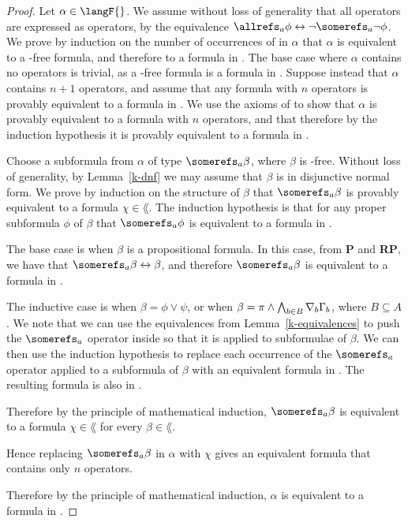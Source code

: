 \begin{proof}
Let $\alpha \in \langF{}$. We assume without loss of generality that all
\allrefs{} operators are expressed as \somerefs{} operators, by the equivalence
$\allrefs_a \phi \iff \neg \somerefs_a \neg \phi$. We prove by induction on the
number of occurrences of \somerefs{} in $\alpha$ that $\alpha$ is equivalent to
a \somerefs{}-free formula, and therefore to a formula in \lang{}. The base
case where $\alpha$ contains no \somerefs{} operators is trivial, as a
\somerefs{}-free formula is a formula in \lang{}. Suppose instead that $\alpha$
contains $n + 1$ \somerefs{} operators, and assume that any formula with $n$
\somerefs{} operators is provably equivalent to a formula in \lang{}. We use
the axioms of \axiomKF{} to show that $\alpha$ is provably equivalent to a
formula with $n$ \somerefs{} operators, and that therefore by the induction
hypothesis it is provably equivalent to a formula in \lang{}.

Choose a subformula from $\alpha$ of type $\somerefs_a \beta$, where $\beta$ is
\somerefs{}-free. Without loss of generality, by Lemma~\ref{k-dnf} we may assume
that $\beta$ is in disjunctive normal form. We prove by induction on the
structure of $\beta$ that $\somerefs_a \beta$ is provably equivalent to a
formula $\chi \in \lang$. The induction hypothesis is that for any proper
subformula $\phi$ of $\beta$ that $\somerefs_a \phi$ is equivalent to a formula
in \lang{}.

The base case is when $\beta$ is a propositional formula. In this case, from
{\bf P} and {\bf RP}, we have that $\somerefs_a \beta \iff \beta$, and therefore
$\somerefs_a \beta$ is equivalent to a formula in \lang{}. 

The inductive case is when $\beta = \phi \lor \psi$, or when $\beta = \pi \land
\bigwedge_{b \in B} \nabla_b \Gamma_b$, where $B \subseteq A$. We note that we
can use the equivalences from Lemma~\ref{k-equivalences} to push the $\somerefs_a$
operator inside so that it is applied to subformulae of $\beta$. We can then use
the induction hypothesis to replace each occurrence of the $\somerefs_a$
operator applied to a subformula of $\beta$ with an equivalent formula in
\lang{}. The resulting formula is also in \lang{}.

Therefore by the principle of mathematical induction, $\somerefs_a \beta$ is
equivalent to a formula $\chi \in \lang{}$ for every $\beta \in \lang{}$. 

Hence replacing $\somerefs_a \beta$ in $\alpha$ with $\chi$ gives an equivalent
formula that contains only $n$ \somerefs{} operators.

Therefore by the principle of mathematical induction, $\alpha$ is equivalent to
a formula in \lang{}.
\end{proof}

